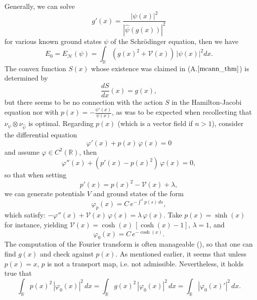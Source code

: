 \documentclass[12pt,a4paper]{article}
\newcommand{\HH}{\mathcal{H}}
\newcommand{\VV}{\mathcal{V}}
\begin{document}
Generally, we can solve 
\begin{equation}
    g'(x) = \frac{|\psi(x)|^2}{|\hat\psi(g(x))|^2}
\end{equation} 
for various known ground states $\psi$ of the Schrödinger equation, then we have
\begin{displaymath}
     E_0=E_\HH(\psi) = \int_{\mathbb{R}} \left(g(x)^2+\VV(x)\right)\, |\psi(x)|^2 dx.
\end{displaymath}
The convex function $S(x)$ whose existence was claimed in (A.$\ref{mcann_thm}$) is
determined by
\begin{displaymath}
     \frac{dS}{dx}(x) = g(x),
\end{displaymath} 
but there seems to be no connection with the action $S$ in the Hamilton-Jacobi 
equation nor with $p(x)=-\frac{\psi'(x)}{\psi(x)}$, as was to be expected when
recollecting that $\nu_\psi\otimes\nu_{\hat\psi}$ is optimal. Regarding $p(x)$
(which is a vector field if $n>1$), consider the differential equation
\begin{equation*}
   \varphi'(x)+p(x)\,\varphi(x)=0
\end{equation*}
and assume $\varphi\in C^2(\mathbb{R})$, then 
\begin{equation*}
   \varphi''(x)+(p'(x)-p(x)^2)\,\varphi(x)=0,
\end{equation*}
so that when setting
\begin{displaymath}
  p'(x) = p(x)^2 - \VV(x) + \lambda,
\end{displaymath}
we can generate potentials $V$ and ground states of the form
\begin{displaymath}
      \varphi_p(x) = C \, e^{-\int^x p(s)\,ds},
\end{displaymath}
which satisfy: $-\varphi''(x)+\VV(x)\,\varphi(x)=\lambda\,\varphi(x)$. Take
$p(x)=\sinh(x)$ for instance, yielding $\VV(x)=\cosh(x)\,[\cosh(x)-1]$, $\lambda=1$,
and
\begin{displaymath}
    \varphi_0(x)=C\,e^{-\cosh(x)}.
\end{displaymath}
The computation of the Fourier transform is often manageable (\cite{tables_trafos}), 
so that one can find $g(x)$ and check against $p(x)$. As mentioned earlier, it seems 
that unless $p(x)=x$, $p$ is not a transport map, i.e. not admissible.  
Nevertheless, it holds true that
\begin{equation*}
    \int_{\mathbb{R}} p(x)^2\,|\varphi_0(x)|^2\, dx =
    \int_{\mathbb{R}} g(x)^2\,|\varphi_0(x)|^2\, dx =
    \int_{\mathbb{R}} |\varphi_0(x)'|^2\,dx.
\end{equation*}
\end{document}
